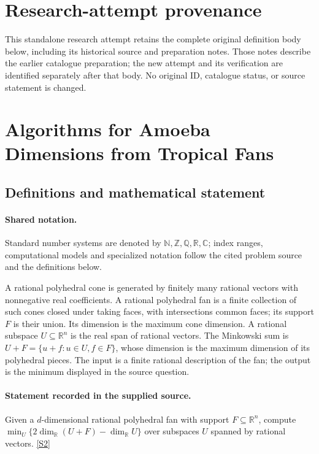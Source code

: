 \documentclass[11pt]{article}
\begin{document}
\section*{Research-attempt provenance}
This standalone research attempt retains the complete original definition body below,
including its historical source and preparation notes. Those notes describe the
earlier catalogue preparation; the new attempt and its verification are identified
separately after that body. No original ID, catalogue status, or source statement is changed.

\section{Algorithms for Amoeba Dimensions from Tropical Fans}\label{statement}

\subsection{Definitions and mathematical statement}

\paragraph{Shared notation.}Standard number systems are denoted by $\mathbb N,\mathbb Z,\mathbb Q,\mathbb R,\mathbb C$; index ranges, computational models and specialized notation follow the cited problem source and the definitions below.


A rational polyhedral cone is generated by finitely many rational vectors with nonnegative real coefficients. A rational polyhedral fan is a finite collection of such cones closed under taking faces, with intersections common faces; its support $F$ is their union. Its dimension is the maximum cone dimension. A rational subspace $U\subseteq\mathbb R^n$ is the real span of rational vectors. The Minkowski sum is $U+F=\{u+f:u\in U,f\in F\}$, whose dimension is the maximum dimension of its polyhedral pieces. The input is a finite rational description of the fan; the output is the minimum displayed in the source question.
\paragraph{Statement recorded in the supplied source.}
Given a $d$-dimensional rational polyhedral fan with support $F\subseteq\mathbb R^n$, compute $\min_U\{2\dim_{\mathbb R}(U+F)-\dim_{\mathbb R}U\}$ over subspaces $U$ spanned by rational vectors. \href{https://doi.org/10.4171/owr/2023/15}{[S2]}
\end{document}
